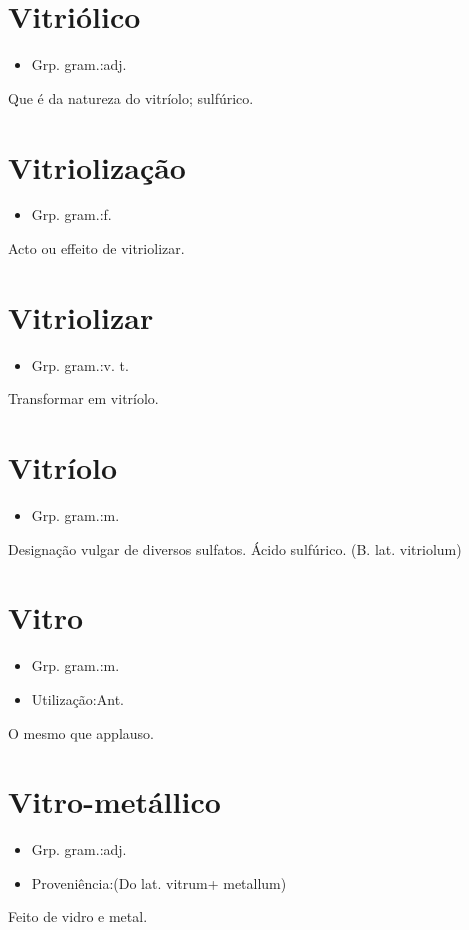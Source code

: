 \documentclass{article}
\begin{document}
\section{Vitriólico}
\begin{itemize}
\item {Grp. gram.:adj.}
\end{itemize}
Que é da natureza do vitríolo; sulfúrico.
\section{Vitriolização}
\begin{itemize}
\item {Grp. gram.:f.}
\end{itemize}
Acto ou effeito de vitriolizar.
\section{Vitriolizar}
\begin{itemize}
\item {Grp. gram.:v. t.}
\end{itemize}
Transformar em vitríolo.
\section{Vitríolo}
\begin{itemize}
\item {Grp. gram.:m.}
\end{itemize}
Designação vulgar de diversos sulfatos.
Ácido sulfúrico.
(B. lat. \textunderscore vitriolum\textunderscore )
\section{Vitro}
\begin{itemize}
\item {Grp. gram.:m.}
\end{itemize}
\begin{itemize}
\item {Utilização:Ant.}
\end{itemize}
O mesmo que \textunderscore applauso\textunderscore .
\section{Vitro-metállico}
\begin{itemize}
\item {Grp. gram.:adj.}
\end{itemize}
\begin{itemize}
\item {Proveniência:(Do lat. \textunderscore vitrum\textunderscore  + \textunderscore metallum\textunderscore )}
\end{itemize}
Feito de vidro e metal.
\end{document}
